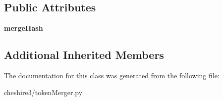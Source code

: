 \subsection*{Public Attributes}
\begin{DoxyCompactItemize}
\item 
\hypertarget{classcheshire3_1_1token_merger_1_1_phrase_token_merger_a2f065ef128f00ec05031ff2b15826f0b}{{\bfseries merge\-Hash}}\label{classcheshire3_1_1token_merger_1_1_phrase_token_merger_a2f065ef128f00ec05031ff2b15826f0b}

\end{DoxyCompactItemize}
\subsection*{Additional Inherited Members}


The documentation for this class was generated from the following file\-:\begin{DoxyCompactItemize}
\item 
cheshire3/token\-Merger.\-py\end{DoxyCompactItemize}
